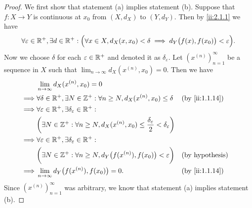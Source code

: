 \begin{proof}
  We first show that statement (a) implies statement (b).
  Suppose that \(f : X \to Y\) is continuous at \(x_0\) from \((X, d_X)\) to \((Y, d_Y)\).
  Then by \cref{ii:2.1.1} we have
  \[
    \forall \varepsilon \in \mathbb{R}^+, \exists d \in \mathbb{R}^+ : \Big(\forall x \in X, d_X(x, x_0) < \delta \implies d_Y\big(f(x), f(x_0)\big) < \varepsilon\Big).
  \]
  Now we choose \(\delta\) for each \(\varepsilon \in \mathbb{R}^+\) and denoted it as \(\delta_\varepsilon\).
  Let \((x^{(n)})_{n = 1}^\infty\) be a sequence in \(X\) such that \(\lim_{n \to \infty} d_X(x^{(n)}, x_0) = 0\).
  Then we have
  \begin{align*}
             & \lim_{n \to \infty} d_X(x^{(n)}, x_0) = 0                                                                                                                \\
    \implies & \forall \delta \in \R^+, \exists N \in \Z^+ : \forall n \geq N, d_X(x^{(n)}, x_0) \leq \delta                                &  & \by{ii:1.1.14}         \\
    \implies & \forall \varepsilon \in \R^+, \exists \delta_\varepsilon \in \R^+ :                                                                                      \\
             & \bigg(\exists N \in \Z^+ : \forall n \geq N, d_X(x^{(n)}, x_0) \leq \dfrac{\delta_\varepsilon}{2} < \delta_\varepsilon\bigg)                             \\
    \implies & \forall \varepsilon \in \R^+, \exists \delta_\varepsilon \in \R^+ :                                                                                      \\
             & \bigg(\exists N \in \Z^+ : \forall n \geq N, d_Y\big(f(x^{(n)}), f(x_0)\big) < \varepsilon\bigg)                             &  & \text{(by hypothesis)} \\
    \implies & \lim_{n \to \infty} d_Y\big(f(x^{(n)}), f(x_0)\big) = 0.                                                                     &  & \by{ii:1.1.14}
  \end{align*}
  Since \((x^{(n)})_{n = 1}^\infty\) was arbitrary, we know that statement (a) implies statement (b).


\end{proof}
